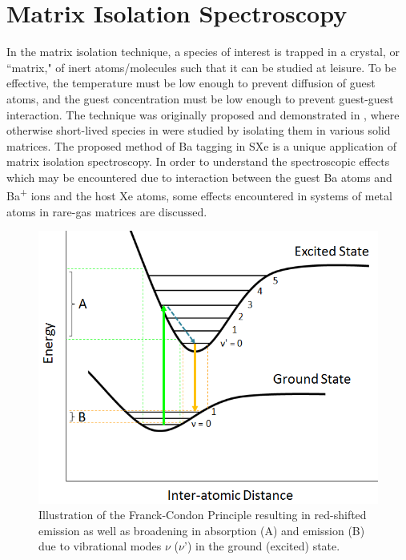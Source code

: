 \section{Matrix Isolation Spectroscopy}
\label{sec:matrix}


In the matrix isolation technique, a species of interest is trapped in a crystal, or ``matrix," of inert atoms/molecules such that it can be studied at leisure.  To be effective, the temperature must be low enough to prevent diffusion of guest atoms, and the guest concentration must be low enough to prevent guest-guest interaction.  The technique was originally proposed and demonstrated in \cite{matrixIso}, where otherwise short-lived species in were studied by isolating them in various solid matrices.  The proposed method of Ba tagging in SXe is a unique application of matrix isolation spectroscopy.  In order to understand the spectroscopic effects which may be encountered due to interaction between the guest Ba atoms and Ba\textsuperscript{+} ions and the host Xe atoms, some effects encountered in systems of metal atoms in rare-gas matrices are discussed.


\begin{figure} %
        \centering
                \includegraphics[width=.6\textwidth]{figures/FranckCondon3.png}
                \caption{Illustration of the Franck-Condon Principle resulting in red-shifted emission as well as broadening in absorption (A) and emission (B) due to vibrational modes $\nu$ ($\nu$') in the ground (excited) state.}
\label{fig:FranckCondon}
\end{figure}

